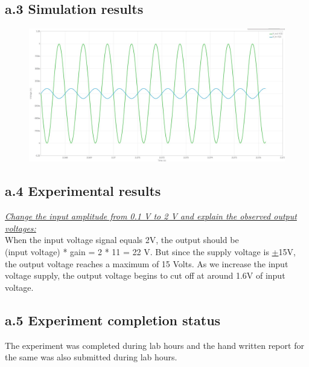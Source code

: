 \documentclass[12pt]{article}
\begin{document}
\subsection*{a.3 Simulation results}%
\begin{figure}[h!]
\centering
\includegraphics[scale = 0.4]{Sim_1_a.jpg}
\end{figure}

\subsection*{a.4 Experimental results}
\underline{\textit{Change the input amplitude from 0.1 V to 2 V and explain the observed output voltages:}}\\
When the input voltage signal equals 2V, the output should be \\(input voltage) * gain = 2 * 11 = 22 V. But since the supply voltage is \underline{+}15V, the output voltage reaches a maximum of 15 Volts. As we increase the input voltage supply, the output voltage begins to cut off at around 1.6V of input voltage.\\

\subsection*{a.5 Experiment completion status}
The experiment was completed during lab hours and the hand written report for the same was also submitted during lab hours.




\newpage

\end{document}
